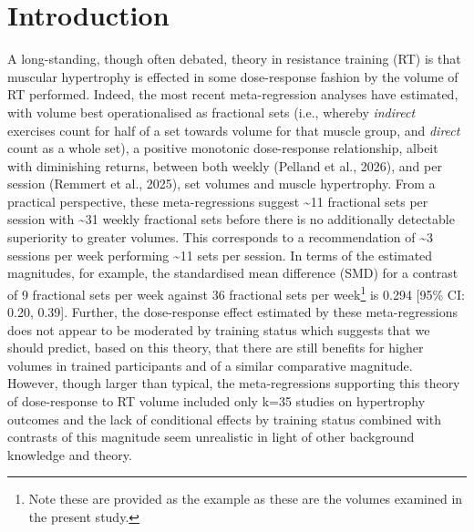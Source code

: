 \documentclass[
]{article}
\begin{document}
\section{Introduction}\label{introduction}

A long-standing, though often debated, theory in resistance training
(RT) is that muscular hypertrophy is effected in some dose-response
fashion by the volume of RT performed. Indeed, the most recent
meta-regression analyses have estimated, with volume best
operationalised as fractional sets (i.e., whereby \emph{indirect}
exercises count for half of a set towards volume for that muscle group,
and \emph{direct} count as a whole set), a positive monotonic
dose-response relationship, albeit with diminishing returns, between
both weekly (Pelland et al., 2026), and per session (Remmert et al.,
2025), set volumes and muscle hypertrophy. From a practical perspective,
these meta-regressions suggest \textasciitilde11 fractional sets per
session with \textasciitilde31 weekly fractional sets before there is no
additionally detectable superiority to greater volumes. This corresponds
to a recommendation of \textasciitilde3 sessions per week performing
\textasciitilde11 sets per session. In terms of the estimated
magnitudes, for example, the standardised mean difference (SMD) for a
contrast of 9 fractional sets per week against 36 fractional sets per
week\footnote{Note these are provided as the example as these are the
  volumes examined in the present study.} is 0.294 {[}95\% CI: 0.20,
0.39{]}. Further, the dose-response effect estimated by these
meta-regressions does not appear to be moderated by training status
which suggests that we should predict, based on this theory, that there
are still benefits for higher volumes in trained participants and of a
similar comparative magnitude. However, though larger than typical, the
meta-regressions supporting this theory of dose-response to RT volume
included only k=35 studies on hypertrophy outcomes and the lack of
conditional effects by training status combined with contrasts of this
magnitude seem unrealistic in light of other background knowledge and
theory.
\end{document}
